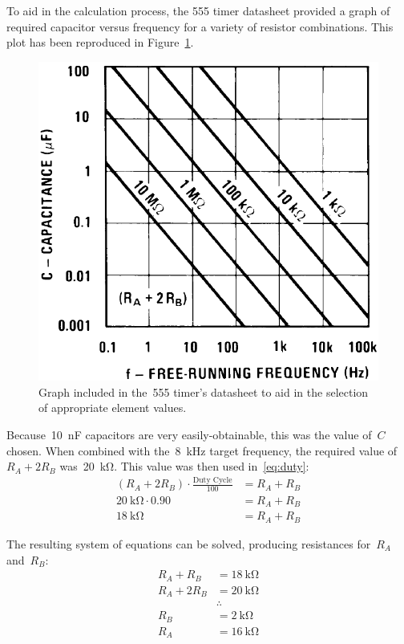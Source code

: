 To aid in the calculation process, the 555 timer datasheet provided a graph of
required capacitor versus frequency for a variety of resistor combinations.
This plot has been reproduced in Figure~\ref{f:cap_graph}.
%
\begin{figure}[H]
\centering
	\includegraphics[width=.6\textwidth]{img/shot/555_graph.png}
	\parbox{.6\textwidth}{
	\caption[Datasheet Aide Graph]{Graph included in the~555 timer's datasheet
	to aid in the selection of appropriate element values.}
	\label{f:cap_graph}}
\end{figure}
%
Because~\SI{10}{\nano\farad} capacitors are very easily-obtainable, this was
the value of~$C$ chosen.  When combined with the~\SI{8}{\kilo\hertz} target
frequency, the required value of~$R_A + 2 R_B$ was~\SI{20}{\kilo\ohm}.  This
value was then used in~\eqref{eq:duty}:
%
\begin{align*}
	\left( R_A + 2 R_B \right) \cdot \frac{\text{Duty Cycle}}{100} &= R_A + R_B \\
	\SI{20}{\kilo\ohm} \cdot 0.90 &= R_A + R_B \\
	\SI{18}{\kilo\ohm} &= R_A + R_B
\end{align*}

The resulting system of equations can be solved, producing resistances
for~$R_A$ and~$R_B$:
%
\begin{align*}
	R_A + R_B &= \SI{18}{\kilo\ohm} \\
	R_A + 2R_B &= \SI{20}{\kilo\ohm} \\
	&\therefore \\
	R_B &= \SI{2}{\kilo\ohm} \\
	R_A &= \SI{16}{\kilo\ohm} \\
\end{align*}

